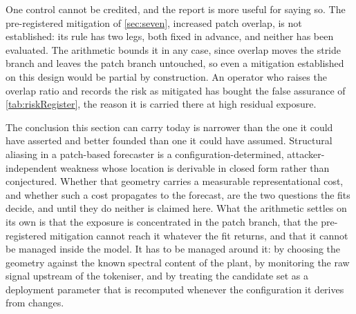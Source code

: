 One control cannot be credited, and the report is more useful for saying so. The pre-registered mitigation of \autoref{sec:seven}, increased patch overlap, is not established: its rule has two legs, both fixed in advance, and neither has been evaluated. The arithmetic bounds it in any case, since overlap moves the stride branch and leaves the patch branch untouched, so even a mitigation established on this design would be partial by construction. An operator who raises the overlap ratio and records the risk as mitigated has bought the false assurance of \autoref{tab:riskRegister}, the reason it is carried there at high residual exposure.

The conclusion this section can carry today is narrower than the one it could have asserted and better founded than one it could have assumed. Structural aliasing in a patch-based forecaster is a configuration-determined, attacker-independent weakness whose location is derivable in closed form rather than conjectured. Whether that geometry carries a measurable representational cost, and whether such a cost propagates to the forecast, are the two questions the fits decide, and until they do neither is claimed here. What the arithmetic settles on its own is that the exposure is concentrated in the patch branch, that the pre-registered mitigation cannot reach it whatever the fit returns, and that it cannot be managed inside the model. It has to be managed around it: by choosing the geometry against the known spectral content of the plant, by monitoring the raw signal upstream of the tokeniser, and by treating the candidate set as a deployment parameter that is recomputed whenever the configuration it derives from changes.